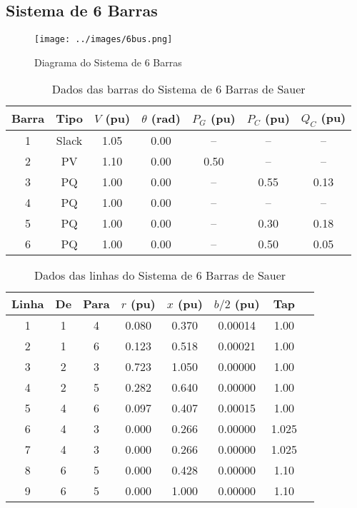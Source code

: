 \documentclass[journal]{IEEEtran}
\begin{document}
\clearpage
\subsection{Sistema de 6 Barras}
\begin{figure}[h!]
  \centering
  \texttt{[image: ../images/6bus.png]}
  \caption{Diagrama do Sistema de 6 Barras}
\end{figure}

\begin{table}[h!]
\centering
\caption{Dados das barras do Sistema de 6 Barras de Sauer}
\label{tab:sauer6bus_barras}
\begin{tabular}{c|c|c|c|c|c|c}
\hline
Barra & Tipo  & $V$ (pu) & $\theta$ (rad) & $P_{G}$ (pu) & $P_{C}$ (pu) & $Q_{C}$ (pu) \\
\hline
1 & Slack & 1.05 & 0.00 & --    & --    & --    \\
2 & PV    & 1.10 & 0.00 & 0.50  & --    & --    \\
3 & PQ    & 1.00 & 0.00 & --    & 0.55  & 0.13  \\
4 & PQ    & 1.00 & 0.00 & --    & --    & --    \\
5 & PQ    & 1.00 & 0.00 & --    & 0.30  & 0.18  \\
6 & PQ    & 1.00 & 0.00 & --    & 0.50  & 0.05  \\
\hline
\end{tabular}
\end{table}

\begin{table}[h!]
\centering
\caption{Dados das linhas do Sistema de 6 Barras de Sauer}
\label{tab:sauer6bus_linhas}
\begin{tabular}{c|c|c|c|c|c|c|c}
\hline
Linha & De & Para & $r$ (pu) & $x$ (pu) & $b/2$ (pu) & Tap \\
\hline
1 & 1 & 4 & 0.080 & 0.370 & 0.00014 & 1.00 \\
2 & 1 & 6 & 0.123 & 0.518 & 0.00021 & 1.00 \\
3 & 2 & 3 & 0.723 & 1.050 & 0.00000 & 1.00 \\
4 & 2 & 5 & 0.282 & 0.640 & 0.00000 & 1.00 \\
5 & 4 & 6 & 0.097 & 0.407 & 0.00015 & 1.00 \\
6 & 4 & 3 & 0.000 & 0.266 & 0.00000 & 1.025 \\
7 & 4 & 3 & 0.000 & 0.266 & 0.00000 & 1.025 \\
8 & 6 & 5 & 0.000 & 0.428 & 0.00000 & 1.10 \\
9 & 6 & 5 & 0.000 & 1.000 & 0.00000 & 1.10 \\
\hline
\end{tabular}
\end{table}
\end{document}
